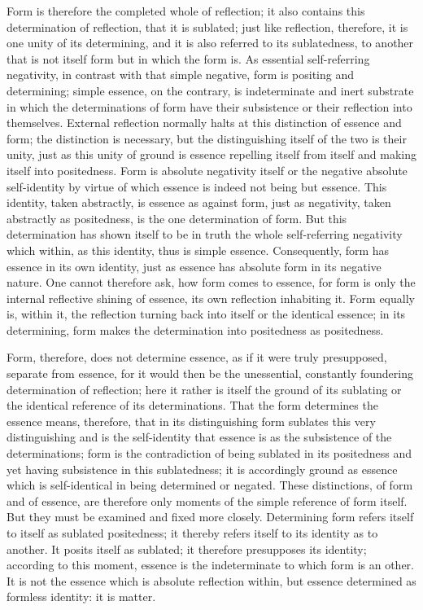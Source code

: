 Form is therefore the completed whole of reflection;
it also contains this determination of reflection, that it is sublated;
just like reflection, therefore, it is one unity of its determining,
and it is also referred to its sublatedness,
to another that is not itself form but in which the form is.
As essential self-referring negativity,
in contrast with that simple negative,
form is positing and determining;
simple essence, on the contrary, is indeterminate and inert
substrate in which the determinations of form have their subsistence
or their reflection into themselves.
External reflection normally halts at
this distinction of essence and form;
the distinction is necessary,
but the distinguishing itself of the two is their unity,
just as this unity of ground is essence repelling itself from itself
and making itself into positedness.
Form is absolute negativity itself
or the negative absolute self-identity
by virtue of which essence is indeed not being but essence.
This identity, taken abstractly, is essence as against form,
just as negativity, taken abstractly as positedness,
is the one determination of form.
But this determination has shown itself to be in truth
the whole self-referring negativity
which within, as this identity, thus is simple essence.
Consequently, form has essence in its own identity,
just as essence has absolute form in its negative nature.
One cannot therefore ask, how form comes to essence,
for form is only the internal reflective shining of essence,
its own reflection inhabiting it.
Form equally is, within it,
the reflection turning back into itself
or the identical essence;
in its determining, form makes the determination
into positedness as positedness.

Form, therefore, does not determine essence,
as if it were truly presupposed, separate from essence,
for it would then be the unessential,
constantly foundering determination of reflection;
here it rather is itself the ground of its sublating
or the identical reference of its determinations.
That the form determines the essence means, therefore,
that in its distinguishing form sublates this very distinguishing
and is the self-identity that essence is
as the subsistence of the determinations;
form is the contradiction of being sublated in its positedness
and yet having subsistence in this sublatedness;
it is accordingly ground as essence which
is self-identical in being determined or negated.
These distinctions, of form and of essence,
are therefore only moments of the simple reference of form itself.
But they must be examined and fixed more closely.
Determining form refers itself to itself as sublated positedness;
it thereby refers itself to its identity as to another.
It posits itself as sublated;
it therefore presupposes its identity;
according to this moment, essence is the indeterminate
to which form is an other.
It is not the essence which is absolute reflection within,
but essence determined as formless identity:
it is matter.


